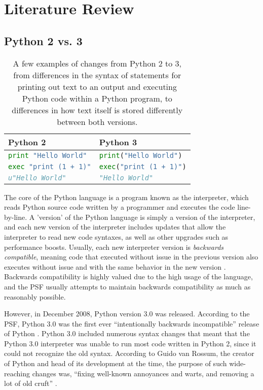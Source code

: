 \section{Literature Review}

\subsection{Python 2 vs. 3}
\begin{table*}[b!]
    \begin{tabular}{@{}l|l@{}}
    \toprule
    Python 2             & Python 3              \\ \midrule
    \lstinline[language=Python, style=pythonstyle]|print "Hello World"|  & \lstinline[language=Python, style=pythonstyle]|print("Hello World")|  \\
    \lstinline[language=Python, style=pythonstyle]|exec "print (1 + 1)"| & \lstinline[language=Python, style=pythonstyle]|exec("print (1 + 1)")| \\
    \lstinline[language=Python, style=pythonstyle]|u"Hello World"|       & \lstinline[language=Python, style=pythonstyle]|"Hello World"|\\  \bottomrule      
    \end{tabular}
    \caption{A few examples of changes from Python 2 to 3, from differences in the syntax of statements for printing out text to an output and executing Python code within a Python program, to differences in how text itself is stored differently between both versions.}
    \label{tab:python-2-vs-3}
\end{table*}

The core of the Python language is a program known as the interpreter, which reads Python source code written by a programmer and executes the code line-by-line. A 'version' of the Python language is simply a version of the interpreter, and each new version of the interpreter includes updates that allow the interpreter to read new code syntaxes, as well as other upgrades such as performance boosts. Usually, each new interpreter version is \textit{backwards compatible}, meaning code that executed without issue in the previous version also executes without issue and with the same behavior in the new version \autocite{Malloy}. Backwards compatibility is highly valued due to the high usage of the language, and the PSF usually attempts to maintain backwards compatibility as much as reasonably possible.

However, in December 2008, Python version 3.0 was released. According to the PSF, Python 3.0 was the first ever “intentionally backwards incompatible” release of Python \autocite{vanRossum}. Python 3.0 included numerous syntax changes that meant that the Python 3.0 interpreter was unable to run most code written in Python 2, since it could not recognize the old syntax. According to Guido van Rossum, the creator of Python and head of its development at the time, the purpose of such wide-reaching changes was, “fixing well-known annoyances and warts, and removing a lot of old cruft” \autocite{vanRossum}.

